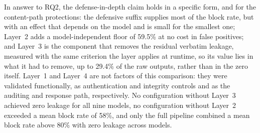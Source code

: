 In answer to RQ2, the defense-in-depth claim holds in a specific form, and for the content-path protections: the defensive suffix supplies most of the block rate, but with an effect that depends on the model and is small for the smallest one; Layer~2 adds a model-independent floor of 59.5\% at no cost in false positives; and Layer~3 is the component that removes the residual verbatim leakage, measured with the same criterion the layer applies at runtime, so its value lies in what it had to remove, up to 29.4\% of the raw outputs, rather than in the zero itself. Layer~1 and Layer~4 are not factors of this comparison: they were validated functionally, as authentication and integrity controls and as the auditing and response path, respectively. No configuration without Layer~3 achieved zero leakage for all nine models, no configuration without Layer~2 exceeded a mean block rate of 58\%, and only the full pipeline combined a mean block rate above 80\% with zero leakage across models.
